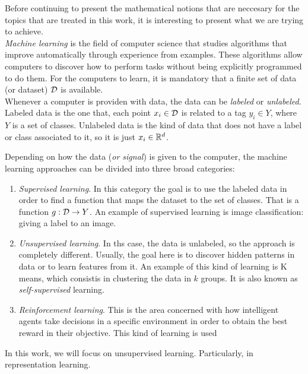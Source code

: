 


Before continuing to present the mathematical notions that are neccesary for the topics that are treated in this work, it is interesting to present what we are trying to achieve.\\

\emph{Machine learning} is the field of computer science that studies algorithms that improve automatically through experience from examples. 
These algorithms allow computers to discover how to
perform tasks without being explicitly programmed to do them. For the computers to learn, it is mandatory that a finite set of data (or dataset) $\mathcal{D}$ is available. \\

Whenever a computer is providen with data, the data can be \emph{labeled} or \emph{unlabeled}. Labeled data is the one that, each point $x_i \in \mathcal{D}$ is related to a tag $y_i \in Y$, where $Y$ is a set of classes.
Unlabeled data is the kind of data that does not have a label or class associated to it, so it is just $x_i \in \mathbb{R}^d$. 

Depending on how the data (\emph{or signal}) is given to the computer, the machine learning approaches can be divided into three broad categories:
\begin{enumerate}
    \item \emph{Supervised learning}. In this category the goal is to use the labeled data in order to find a function that maps the dataset to the set of classes. That is a function $g:\mathcal{D} \to Y$. 
    An example of supervised learning is image classification: giving a label to an image.
    \item \emph{Unsupervised learning}. In ths case, the data is unlabeled, so the approach is completely different. Usually, the goal here is to discover hidden patterns in data or to learn features from it.
    An example of this kind of learning is K means, which consistis in clustering the data in $k$ groups. It is also known as \emph{self-supervised} learning.
    \item \emph{Reinforcement learning}. This is the area concerned with how intelligent agents take decisions in a specific environment in order to obtain the best reward in their objective. This kind of learning is used

\end{enumerate}

In this work, we will focus on unsupervised learning. Particularly, in representation learning.\\


